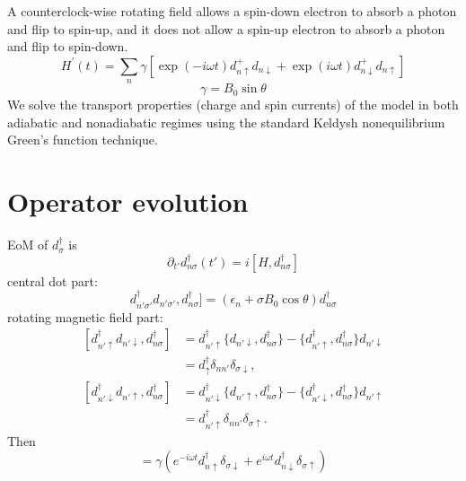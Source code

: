 \documentclass[11pt,a4paper]{article}
\begin{document}
A counterclock-wise rotating field allows a spin-down electron to absorb a photon and flip to spin-up, and it does not allow a spin-up electron to absorb a photon and flip to spin-down.
\begin{equation}
H^{\prime}(t)=\sum_{n}\gamma\left[\exp (-i \omega t) d_{n\uparrow}^{+} d_{n\downarrow}+\exp (i \omega t) d_{n\downarrow}^{+} d_{n\uparrow}\right]
\end{equation}
\begin{equation}
\gamma=B_{0} \sin \theta
\end{equation}
We solve the transport properties (charge and spin currents) of the model in both adiabatic and nonadiabatic regimes using the standard Keldysh nonequilibrium Green’s function technique.
\section{Operator evolution}
EoM of $d_{\sigma}^{\dag}$ is
\begin{equation}
\partial_{t'} d_{n\sigma}^{\dag}(t') = i[H, d_{n\sigma}^{\dag}]
\label{eq:eom1}
\end{equation}
central dot part:
\begin{equation}
[\sum_{n'\sigma'}\left[\epsilon_{n'}+\sigma B_{0} \cos \theta\right] d_{n'\sigma'}^{\dag} d_{n'\sigma'}, d_{n\sigma}^{\dag}] =(\epsilon_{n}+\sigma B_{0} \cos \theta) d_{n\sigma}^{\dag}
\label{eq:part1}
\end{equation}
rotating magnetic field part:
\begin{equation}
\begin{split}
[d_{n'\uparrow}^{\dag} d_{n'\downarrow}, d_{n\sigma}^{\dag}] &= d_{n'\uparrow}^{\dag}\{d_{n'\downarrow}, d_{n\sigma}^{\dag}\} - \{d_{n'\uparrow}^{\dag}, d_{n\sigma}^{\dag}\}d_{n'\downarrow} \\
&=d_{\uparrow}^{\dag}\delta_{nn'}\delta_{\sigma\downarrow},
\end{split}
\end{equation}
\begin{equation}
\begin{split}
[d_{n'\downarrow}^{\dag} d_{n'\uparrow}, d_{n\sigma}^{\dag}] &= d_{n'\downarrow}^{\dag}\{d_{n'\uparrow}, d_{n\sigma}^{\dag}\} - \{d_{n'\downarrow}^{\dag}, d_{n\sigma}^{\dag}\}d_{n'\uparrow} \\
&=d_{n'\uparrow}^{\dag}\delta_{nn'}\delta_{\sigma\uparrow}.
\end{split}
\end{equation}
Then
\begin{equation}
[H^{\prime}(t), d_{n\sigma}^{\dag}] = \gamma(e^{-i \omega t} d_{n\uparrow}^{\dag} \delta_{\sigma\downarrow} + e^{i \omega t} d_{n\downarrow}^{\dag} \delta_{\sigma\uparrow})
\end{equation}
\end{document}
